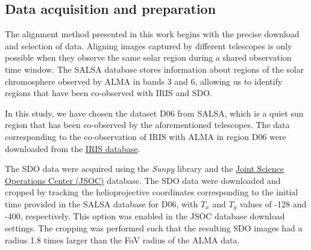 \documentclass[a4paper,alpha-refs]{eSpectra}
\begin{document}


\subsection{Data acquisition and  preparation}
\label{data_preparation}

The alignment method presented in this work begins with the precise download and selection of data. Aligning images captured by different telescopes is only possible when they observe the same solar region during a shared observation time window. The SALSA database stores information about regions of the solar chromosphere observed by ALMA in bands 3 and 6, allowing us to identify regions that have been co-observed with IRIS and SDO.

In this study, we have chosen the dataset D06 from SALSA, which is a quiet sun region that has been co-observed by the aforementioned telescopes. The data corresponding to the co-observation of IRIS with ALMA in region D06 were downloaded from the \href{https://iris.lmsal.com/search/}{IRIS database}. 

The SDO data were acquired using the \textit{Sunpy} library and the \href{http://jsoc.stanford.edu/}{Joint Science Operations Center (JSOC)} database.  
The SDO data were downloaded and cropped by tracking the helioprojective coordinates corresponding to the initial time provided in the SALSA database for D06, with $T_x$ and $T_y$ values of -128 and -400, respectively. This option was enabled in the JSOC database download settings. The cropping was performed such that the resulting SDO images had a radius 1.8 times larger than the FoV radius of the ALMA data.
\end{document}

